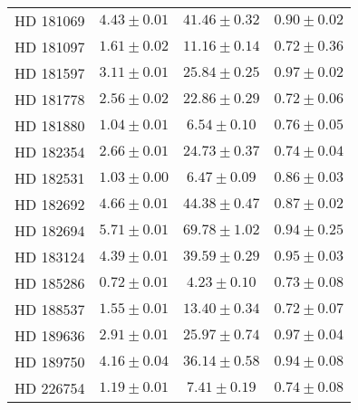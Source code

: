 \begin{table}
\begin{tabular}{cccc}
HD 181069 & $4.43 \pm 0.01$ & $41.46 \pm 0.32$ & $0.90 \pm 0.02$ \\
HD 181097 & $1.61 \pm 0.02$ & $11.16 \pm 0.14$ & $0.72 \pm 0.36$ \\
HD 181597 & $3.11 \pm 0.01$ & $25.84 \pm 0.25$ & $0.97 \pm 0.02$ \\
HD 181778 & $2.56 \pm 0.02$ & $22.86 \pm 0.29$ & $0.72 \pm 0.06$ \\
HD 181880 & $1.04 \pm 0.01$ & $6.54 \pm 0.10$ & $0.76 \pm 0.05$ \\
HD 182354 & $2.66 \pm 0.01$ & $24.73 \pm 0.37$ & $0.74 \pm 0.04$ \\
HD 182531 & $1.03 \pm 0.00$ & $6.47 \pm 0.09$ & $0.86 \pm 0.03$ \\
HD 182692 & $4.66 \pm 0.01$ & $44.38 \pm 0.47$ & $0.87 \pm 0.02$ \\
HD 182694 & $5.71 \pm 0.01$ & $69.78 \pm 1.02$ & $0.94 \pm 0.25$ \\
HD 183124 & $4.39 \pm 0.01$ & $39.59 \pm 0.29$ & $0.95 \pm 0.03$ \\
HD 185286 & $0.72 \pm 0.01$ & $4.23 \pm 0.10$ & $0.73 \pm 0.08$ \\
HD 188537 & $1.55 \pm 0.01$ & $13.40 \pm 0.34$ & $0.72 \pm 0.07$ \\
HD 189636 & $2.91 \pm 0.01$ & $25.97 \pm 0.74$ & $0.97 \pm 0.04$ \\
HD 189750 & $4.16 \pm 0.04$ & $36.14 \pm 0.58$ & $0.94 \pm 0.08$ \\
HD 226754 & $1.19 \pm 0.01$ & $7.41 \pm 0.19$ & $0.74 \pm 0.08$ \\
\hline
\end{tabular}
\end{table}
